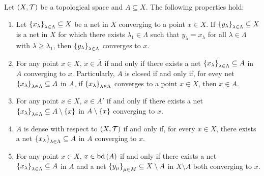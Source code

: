 \begin{proposition}
  Let $\left(X,\mathcal{T}\right)$ be a topological space and $A\subseteq X$. The following properties hold:

  \begin{enumerate}
    \item Let $\left\{x_\lambda\right\}_{\lambda\in\Lambda}\subseteq X$ be a net in $X$ converging to a point $x\in X$. If $\left\{y_\lambda\right\}_{\lambda\in\Lambda}\subseteq X$ is a net in $X$ for which there exists $\lambda_1\in\Lambda$ such that $y_\lambda=x_\lambda$ for all $\lambda\in\Lambda$ with $\lambda\geq\lambda_1$, then $\left\{y_\lambda\right\}_{\lambda\in\Lambda}$ converges to $x$.
    \item For any point $x\in X$, $x\in\overline{A}$ if and only if there exists a net $\left\{x_\lambda\right\}_{\lambda\in\Lambda}\subseteq A$ in $A$ converging to $x$. Particularly, $A$ is closed if and only if, for evey net $\left\{x_\lambda\right\}_{\lambda\in\Lambda}\subseteq A$ in $A$, if $\left\{x_\lambda\right\}_{\lambda\in\Lambda}$ converges to a point $x\in X$, then $x\in A$.
    \item  For any point $x\in X$, $x\in A'$ if and only if there exists a net $\left\{x_\lambda\right\}_{\lambda\in\Lambda}\subseteq A\setminus\left\{x\right\}$ in $A\setminus\left\{x\right\}$ converging to $x$.
    \item $A$ is dense with respect to $\left(X,\mathcal{T}\right)$ if and only if, for every $x\in X$, there exists a net $\left\{x_\lambda\right\}_{\lambda\in\Lambda}\subseteq A$ in $A$ converging to $x$.
    \item For any point $x\in X$, $x\in\operatorname{bd}\left(A\right)$ if and only if there exists a net $\left\{x_\lambda\right\}_{\lambda\in\Lambda}\subseteq A$ in $A$ and a net $\left\{y_\mu\right\}_{\mu\in M}\subseteq X\setminus A$ in $X\setminus A$ both converging to $x$.
  \end{enumerate}


\end{proposition}
